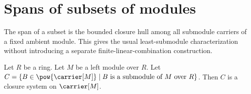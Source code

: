 


\section{Spans of subsets of modules}

The span of a subset is the bounded closure hull among all submodule carriers
of a fixed ambient module.  This gives the usual least-submodule
characterization without introducing a separate finite-linear-combination
construction.

\begin{proposition}\label{submodule_carriers_form_closure_system}
    Let $R$ be a ring.
    Let $M$ be a left module over $R$.
    Let
        $C=\{B\in\pow{\carrier[M]}\mid
            \text{$B$ is a submodule of $M$ over $R$}\}$.
    Then $C$ is a closure system on $\carrier[M]$.
\end{proposition}

